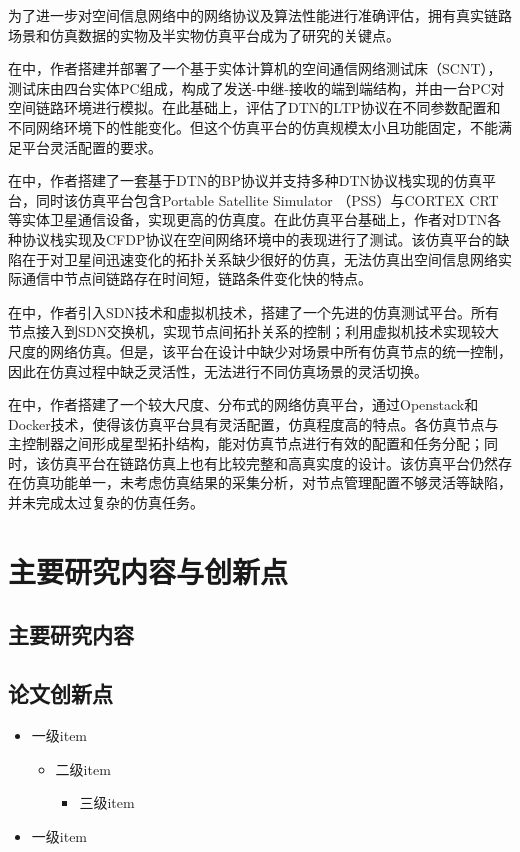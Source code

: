 \documentclass[winfonts,phd,twoside]{njuthesis}
\begin{document}
为了进一步对空间信息网络中的网络协议及算法性能进行准确评估，拥有真实链路场景和仿真数据的实物及半实物仿真平台成为了研究的关键点。

在\cite{1}中，作者搭建并部署了一个基于实体计算机的空间通信网络测试床（SCNT），测试床由四台实体PC组成，构成了发送-中继-接收的端到端结构，并由一台PC对空间链路环境进行模拟。在此基础上，评估了DTN的LTP协议在不同参数配置和不同网络环境下的性能变化。但这个仿真平台的仿真规模太小且功能固定，不能满足平台灵活配置的要求。

在\cite{2}中，作者搭建了一套基于DTN的BP协议并支持多种DTN协议栈实现的仿真平台，同时该仿真平台包含Portable Satellite Simulator （PSS）与CORTEX CRT等实体卫星通信设备，实现更高的仿真度。在此仿真平台基础上，作者对DTN各种协议栈实现及CFDP协议在空间网络环境中的表现进行了测试。该仿真平台的缺陷在于对卫星间迅速变化的拓扑关系缺少很好的仿真，无法仿真出空间信息网络实际通信中节点间链路存在时间短，链路条件变化快的特点。

在\cite{3}中，作者引入SDN技术和虚拟机技术，搭建了一个先进的仿真测试平台。所有节点接入到SDN交换机，实现节点间拓扑关系的控制；利用虚拟机技术实现较大尺度的网络仿真。但是，该平台在设计中缺少对场景中所有仿真节点的统一控制，因此在仿真过程中缺乏灵活性，无法进行不同仿真场景的灵活切换。

在\cite{4}中，作者搭建了一个较大尺度、分布式的网络仿真平台，通过Openstack和Docker技术，使得该仿真平台具有灵活配置，仿真程度高的特点。各仿真节点与主控制器之间形成星型拓扑结构，能对仿真节点进行有效的配置和任务分配；同时，该仿真平台在链路仿真上也有比较完整和高真实度的设计。该仿真平台仍然存在仿真功能单一，未考虑仿真结果的采集分析，对节点管理配置不够灵活等缺陷，并未完成太过复杂的仿真任务。

\section{主要研究内容与创新点}

\subsection{主要研究内容}

\subsection{论文创新点}

\lipsum[1]
\begin{itemize}
\item 一级item
 \begin{itemize}
 \item 二级item
	\begin{itemize}
	\item 三级item

	\end{itemize}

 \end{itemize}
\item 一级item

\end{itemize}
\end{document}
